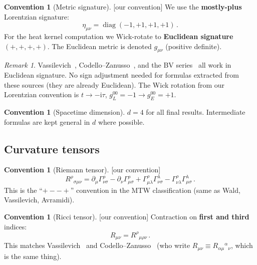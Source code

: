 \documentclass[12pt,a4paper]{article}
\theoremstyle{definition}
\newtheorem{convention}[proposition]{Convention}
\theoremstyle{remark}
\newtheorem{remark}[proposition]{Remark}
\newcommand{\ii}{\mathrm{i}}
\newcommand{\oursign}{\textcolor{teal!80!black}{\textsf{[our convention]}}}
\begin{document}
\begin{convention}[Metric signature]
\oursign\;
We use the \textbf{mostly-plus} Lorentzian signature:
\begin{equation}
  \eta_{\mu\nu} = \operatorname{diag}(-1,+1,+1,+1)\,.
  \label{eq:signature}
\end{equation}
For the heat kernel computation we Wick-rotate to \textbf{Euclidean
signature} $(+,+,+,+)$.  The Euclidean metric is denoted $g_{\mu\nu}$
(positive definite).
\end{convention}

\begin{remark}
Vassilevich~\cite{Vassilevich2003}, Codello--Zanusso~\cite{CZ2012},
and the BV series~\cite{BV1987,BV1990a} all work in Euclidean
signature.  No sign adjustment needed for formulas extracted from
these sources (they are already Euclidean).  The Wick rotation from
our Lorentzian convention is
$t \to -\ii\tau$, $g^{00}_L = -1 \to g^{00}_E = +1$.
\end{remark}

\begin{convention}[Spacetime dimension]
$d = 4$ for all final results.  Intermediate formulas are kept
general in $d$ where possible.
\end{convention}


\subsection{Curvature tensors}

\begin{convention}[Riemann tensor]
\oursign\;
\begin{equation}
  R^{\rho}{}_{\sigma\mu\nu}
  = \partial_\mu \Gamma^\rho_{\nu\sigma}
  - \partial_\nu \Gamma^\rho_{\mu\sigma}
  + \Gamma^\rho_{\mu\lambda}\Gamma^\lambda_{\nu\sigma}
  - \Gamma^\rho_{\nu\lambda}\Gamma^\lambda_{\mu\sigma}\,.
  \label{eq:riemann}
\end{equation}
This is the ``$+--+$'' convention in the MTW classification
(same as Wald, Vassilevich, Avramidi).
\end{convention}

\begin{convention}[Ricci tensor]
\oursign\;
Contraction on \textbf{first and third} indices:
\begin{equation}
  R_{\mu\nu} = R^{\rho}{}_{\mu\rho\nu}\,.
  \label{eq:ricci}
\end{equation}
This matches Vassilevich~\cite{Vassilevich2003} and
Codello--Zanusso~\cite{CZ2012} (who write
$R_{\mu\nu} \equiv R_{\alpha\mu}{}^{\alpha}{}_{\nu}$, which is
the same thing).
\end{convention}
\end{document}
